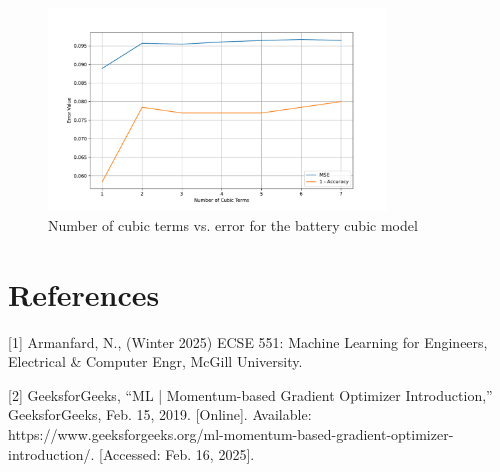\documentclass{article}
\begin{document}
\begin{figure}[H]
  \centering
  \includegraphics[width=0.8\textwidth]{cubic_battery.pdf}
  \caption{Number of cubic terms vs. error for the battery cubic model}
  \label{fig:quad_battery}
\end{figure}

\section*{References}

\medskip

\small

[1] Armanfard, N., (Winter 2025) ECSE 551: Machine Learning for Engineers, Electrical & Computer Engr, McGill University.

[2] GeeksforGeeks, “ML | Momentum-based Gradient Optimizer Introduction,” GeeksforGeeks, Feb. 15, 2019. [Online]. Available: https://www.geeksforgeeks.org/ml-momentum-based-gradient-optimizer-introduction/. [Accessed: Feb. 16, 2025].
\end{document}
